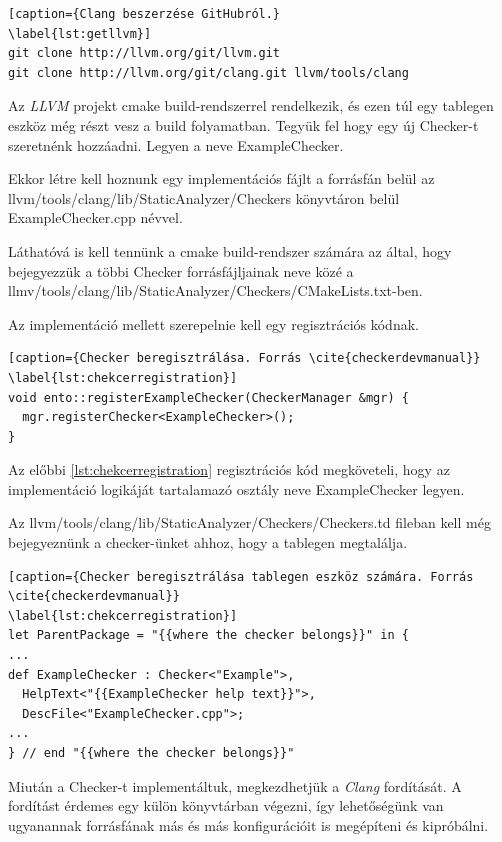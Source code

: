 \documentclass[a4paper,12pt]{report}
\begin{document}
\begin{lstlisting}[caption={Clang beszerzése GitHubról.}
\label{lst:getllvm}]
git clone http://llvm.org/git/llvm.git
git clone http://llvm.org/git/clang.git llvm/tools/clang
\end{lstlisting}

Az \emph{LLVM} projekt cmake build-rendszerrel rendelkezik, és ezen túl egy tablegen eszköz még részt vesz a build folyamatban. Tegyük fel hogy egy új Checker-t szeretnénk hozzáadni. Legyen a neve ExampleChecker.

Ekkor létre kell hoznunk egy implementációs fájlt a forrásfán belül az llvm/tools/clang/lib/StaticAnalyzer/Checkers könyvtáron belül ExampleChecker.cpp névvel.

Láthatóvá is kell tennünk a cmake build-rendszer számára az által, hogy bejegyezzük a többi Checker forrásfájljainak neve közé a llmv/tools/clang/lib/StaticAnalyzer/Checkers/CMakeLists.txt-ben.

Az implementáció mellett szerepelnie kell egy regisztrációs kódnak.

\begin{lstlisting}[caption={Checker beregisztrálása. Forrás \cite{checkerdevmanual}}
\label{lst:chekcerregistration}]
void ento::registerExampleChecker(CheckerManager &mgr) {
  mgr.registerChecker<ExampleChecker>();
}
\end{lstlisting}

Az előbbi \ref{lst:chekcerregistration} regisztrációs kód megköveteli, hogy az implementáció logikáját tartalamazó osztály neve ExampleChecker legyen.

Az llvm/tools/clang/lib/StaticAnalyzer/Checkers/Checkers.td fileban kell még bejegyeznünk a checker-ünket ahhoz, hogy a tablegen megtalálja.

\begin{lstlisting}[caption={Checker beregisztrálása tablegen eszköz számára. Forrás \cite{checkerdevmanual}}
\label{lst:chekcerregistration}]
let ParentPackage = "{{where the checker belongs}}" in {
...
def ExampleChecker : Checker<"Example">,
  HelpText<"{{ExampleChecker help text}}">,
  DescFile<"ExampleChecker.cpp">;
...
} // end "{{where the checker belongs}}"
\end{lstlisting}

Miután a Checker-t implementáltuk, megkezdhetjük a \emph{Clang} fordítását. A fordítást érdemes egy külön könyvtárban végezni, így lehetőségünk van ugyanannak forrásfának más és más konfigurációit is megépíteni és kipróbálni.
\end{document}
